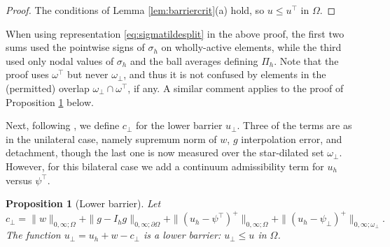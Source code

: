 \documentclass[12pt]{amsart}
\numberwithin{equation}{section}
\theoremstyle{plain}
\newtheorem{proposition}[theorem]{Proposition}
\theoremstyle{definition}
\theoremstyle{remark}
\newcommand{\Om}{\Omega}
\newcommand{\dOm}{\partial\Omega}
\newcommand{\psilo}{\psi_\bot}
\newcommand{\psiup}{\psi^\top}
\newcommand{\Ih}{I_h}
\newcommand{\Pih}{\Pi_h}
\newcommand{\ombot}{\omega_\bot}
\newcommand{\omtop}{\omega^\top}
\begin{document}
\begin{proof}
\noindent The conditions of Lemma \ref{lem:barriercrit}(a) hold, so $u\le u^\top$ in $\Om$.
\end{proof}

When using representation \eqref{eq:sigmatildesplit} in the above proof, the first two sums used the pointwise signs of $\sigma_h$ on wholly-active elements, while the third used only nodal values of $\sigma_h$ and the ball averages defining $\Pih$.  Note that the proof uses $\omtop$ but never $\ombot$, and thus it is not confused by elements in the (permitted) overlap $\ombot \cap \omtop$, if any.  A similar comment applies to the proof of Proposition \ref{prop:lowerbarrier} below.

Next, following \cite[Proposition 4.2]{NSV03}, we define $c_\bot$ for the lower barrier $u_\bot$.  Three of the terms are as in the unilateral case, namely supremum norm of $w$, $g$ interpolation error, and detachment, though the last one is now measured over the star-dilated set $\ombot$.  However, for this bilateral case we add a continuum admissibility term for $u_h$ versus $\psiup$.

\begin{proposition}[Lower barrier]
\label{prop:lowerbarrier}
Let
\begin{equation}
\label{eq:clower}
  c_\bot = \|w\|_{0,\infty;\Om} + \|g-\Ih g\|_{0,\infty;\dOm} + \|(u_h-\psiup)^+\|_{0,\infty;\Om} + \|(u_h-\psilo)^+\|_{0,\infty;\ombot}.
\end{equation}
The function $u_\bot = u_h + w - c_\bot$ is a lower barrier: $u_\bot \le u$ in $\Om$.
\end{proposition}
\end{document}
